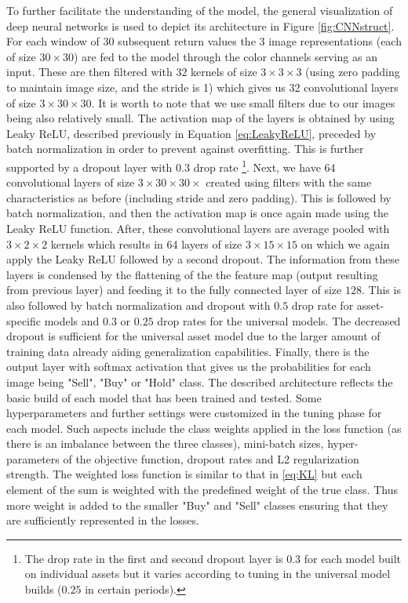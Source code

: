 \documentclass[12pt, a4paper]{article}
\begin{document}
To further facilitate the understanding of the model, the general visualization of deep neural networks is used to depict its architecture in Figure \ref{fig:CNNstruct}. For each window of 30 subsequent return values the 3 image representations (each of size $30 \times 30$) are fed to the model through the color channels serving as an input. These are then filtered with $32$ kernels of size $3 \times 3 \times 3$ (using zero padding to maintain image size, and the stride is 1) which gives us 32 convolutional layers of size $3 \times 30 \times 30$. It is worth to note that we use small filters due to our images being also relatively small. 
The activation map of the layers is obtained by using Leaky ReLU, described previously in Equation \ref{eq:LeakyReLU}, preceded by batch normalization in order to prevent against overfitting. This is further supported by a dropout layer with $0.3$ drop rate \footnote{The drop rate in the first and second dropout layer is $0.3$ for each model built on individual assets but it varies according to tuning in the universal model builds ($0.25$ in certain periods).}. 
Next, we have 64 convolutional layers of size $3 \times 30 \times 30 \times$ created using filters with the same characteristics as before (including stride and zero padding). This is followed by batch normalization, and then the activation map is once again made using the Leaky ReLU function. After, these convolutional layers are average pooled with $3 \times 2 \times 2$ kernels which results in 64 layers of size $3 \times 15 \times 15$ on which we again apply the Leaky ReLU followed by a second dropout. 
The information from these layers is condensed by the flattening of the the feature map (output resulting from previous layer) and feeding it to the fully connected layer of size $128$. This is also followed by batch normalization and dropout with $0.5$ drop rate for asset-specific models and $0.3$ or $0.25$ drop rates for the universal models. The decreased dropout is sufficient for the universal asset model due to the larger amount of training data already aiding generalization capabilities. Finally, there is the output layer with softmax activation that gives us the probabilities for each image being "Sell", "Buy" or "Hold" class. 
The described architecture reflects the basic build of each model that has been trained and tested. Some hyperparameters and further settings were customized in the tuning phase for each model. 
Such aspects include the class weights applied in the loss function (as there is an imbalance between the three classes), mini-batch sizes, hyper-parameters of the objective function, dropout rates and L2 regularization strength. The weighted loss function is similar to that in \ref{eq:KL} but each element of the sum is weighted with the predefined weight of the true class. Thus more weight is added to the smaller "Buy" and "Sell" classes ensuring that they are sufficiently represented in the losses.
\end{document}
